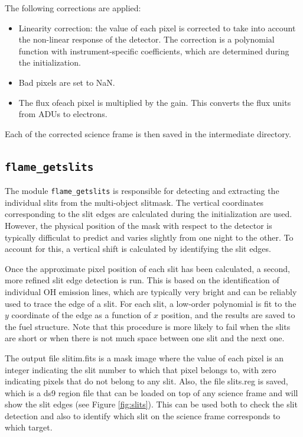 \documentclass[a4paper, notitlepage]{article}
\begin{document}
The following corrections are applied:
\begin{itemize}
\item Linearity correction: the value of each pixel is corrected to take into account the non-linear response of the detector. The correction is a polynomial function with instrument-specific coefficients, which are determined during the initialization.
\item Bad pixels are set to NaN.
\item The flux ofeach pixel is multiplied by the gain. This converts the flux units from ADUs to electrons.
\end{itemize}

Each of the corrected science frame is then saved in the intermediate directory.


\subsection{\texttt{flame\_getslits}}

The module \texttt{flame\_getslits} is responsible for detecting and extracting the individual slits from the multi-object slitmask. The vertical coordinates corresponding to the slit edges are calculated during the initialization are used. However, the physical position of the mask with respect to the detector is typically difficulat to predict and varies slightly from one night to the other. To account for this, a vertical shift is calculated by identifying the slit edges.

Once the approximate pixel position of each slit has been calculated, a second, more refined slit edge detection is run. This is based on the identification of individual OH emission lines, which are typically very bright and can be reliably used to trace the edge of a slit. For each slit, a low-order polynomial is fit to the $y$ coordinate of the edge as a function of $x$ position, and the results are saved to the fuel structure. Note that this procedure is more likely to fail when the slits are short or when there is not much space between one slit and the next one.

The output file slitim.fits is a mask image where the value of each pixel is an integer indicating the slit number to which that pixel belongs to, with zero indicating pixels that do not belong to any slit. Also, the file slits.reg is saved, which is a ds9 region file that can be loaded on top of any science frame and will show the slit edges (see Figure \ref{fig:slits}). This can be used both to check the slit detection and also to identify which slit on the science frame corresponds to which target.
\end{document}
